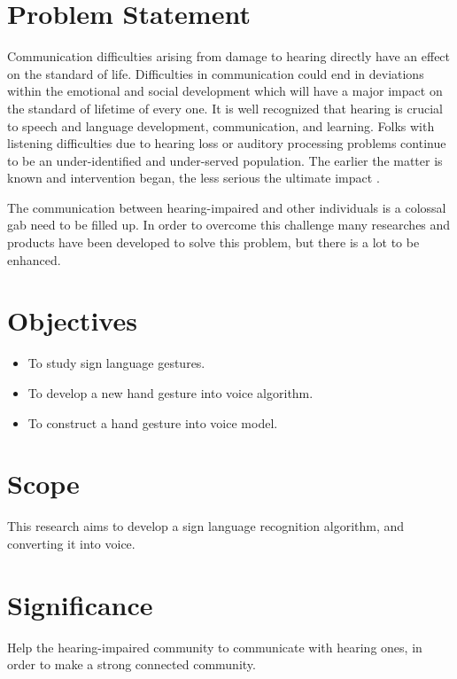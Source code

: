 \documentclass[12pt]{report}
\begin{document}
        \section{Problem Statement}
                Communication difficulties arising from damage to hearing
                directly have an effect on the standard of life. Difficulties in communication could
                end in deviations within the emotional and social development which
                will have a major impact on the standard of lifetime of every one.
                It is well recognized that hearing is crucial to speech and language development, communication, and learning.
                Folks with listening difficulties due to hearing loss or auditory processing problems
                continue to be an under-identified and under-served population. The
                earlier the matter is known and intervention began, the less
                serious the ultimate impact \cite{AFrajtag12017}.

                The communication between hearing-impaired and other individuals is a colossal gab 
                need to be filled up. In order to overcome this challenge 
                many researches and products have been developed to solve this problem, 
                but there is a lot to be enhanced.
        
        \section{Objectives}
            \begin{itemize}
                \item To study sign language gestures.
                \item To develop a new hand gesture into voice algorithm.
                \item To construct a hand gesture into voice model.
            \end{itemize}
        
        \section{Scope}
                This research aims to develop a sign language recognition algorithm,
                and converting it into voice.
        \section{Significance}
                Help the hearing-impaired community to communicate with hearing ones, 
                in order to make a strong connected community.
\end{document}
